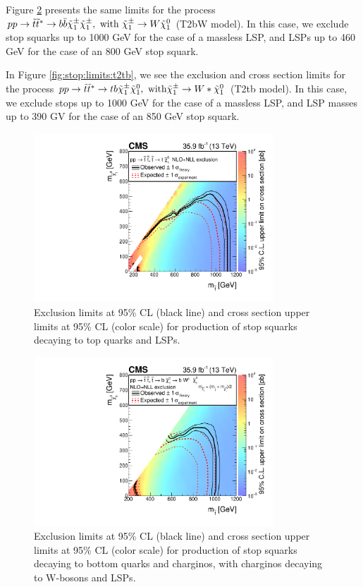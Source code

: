Figure \ref{fig:stop:limits:t2bw} presents the same limits for the
process $pp \rightarrow \tilde{t}\tilde{t}^* \rightarrow b\bar{b}
\tilde{\chi}^\pm_1 \tilde{\chi}^\pm_1,\text{ with } \tilde{\chi}^\pm_1 \rightarrow W
\tilde{\chi}^0_1$ (T2bW model). In this case, we exclude stop squarks up to 1000
GeV for the case of a massless LSP, and LSPs up to 460 GeV for the
case of an 800 GeV stop squark.

In Figure \ref{fig:stop:limits:t2tb}, we see the exclusion and cross
section limits for the process $pp \rightarrow \tilde{t}\tilde{t}^*
\rightarrow tb \tilde{\chi}^\pm_1 \tilde{\chi}^0_1,\text{ with} \tilde{\chi}^\pm_1 \rightarrow
W* \tilde{\chi}^0_1$ (T2tb model). In this case, we exclude stops up to 1000 GeV
for the case of a massless LSP, and LSP masses up to 390 GV for the
case of an 850 GeV stop squark.

\begin{figure}[htbp]
\centering
\includegraphics[width=0.8\textwidth]{figures/limits_T2tt.pdf}
\caption{Exclusion limits at 95\% CL (black line) and cross section
  upper limits at 95\% CL (color scale) for production of stop squarks
  decaying to top quarks and LSPs.}
\label{fig:stop:limits:t2tt}
\end{figure}

\begin{figure}[htbp]
\centering
\includegraphics[width=0.8\textwidth]{figures/limits_T2bW.pdf}
\caption{Exclusion limits at 95\% CL (black line) and cross section
  upper limits at 95\% CL (color scale) for production of stop squarks
  decaying to bottom quarks and charginos, with charginos decaying to
  W-bosons and LSPs.}
\label{fig:stop:limits:t2bw}
\end{figure}

